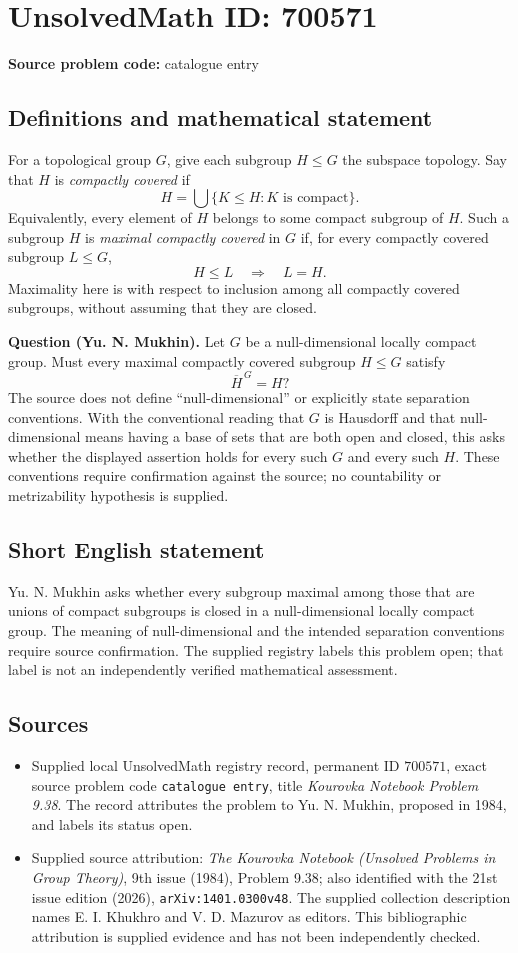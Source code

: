 \documentclass[11pt]{article}
\begin{document}
\section*{UnsolvedMath ID: 700571}
\textbf{Source problem code:} catalogue entry
\subsection{Definitions and mathematical statement}
For a topological group \(G\), give each subgroup \(H\leq G\) the subspace topology. Say that \(H\) is \emph{compactly covered} if
\[
H=\bigcup\{K\leq H:K\text{ is compact}\}.
\]
Equivalently, every element of \(H\) belongs to some compact subgroup of \(H\). Such a subgroup \(H\) is \emph{maximal compactly covered} in \(G\) if, for every compactly covered subgroup \(L\leq G\),
\[
H\leq L\quad\Longrightarrow\quad L=H.
\]
Maximality here is with respect to inclusion among all compactly covered subgroups, without assuming that they are closed.

\textbf{Question (Yu. N. Mukhin).} Let \(G\) be a null-dimensional locally compact group. Must every maximal compactly covered subgroup \(H\leq G\) satisfy
\[
\overline{H}^{\,G}=H?
\]
The source does not define ``null-dimensional'' or explicitly state separation conventions. With the conventional reading that \(G\) is Hausdorff and that null-dimensional means having a base of sets that are both open and closed, this asks whether the displayed assertion holds for every such \(G\) and every such \(H\). These conventions require confirmation against the source; no countability or metrizability hypothesis is supplied.
\subsection{Short English statement}
Yu. N. Mukhin asks whether every subgroup maximal among those that are unions of compact subgroups is closed in a null-dimensional locally compact group. The meaning of null-dimensional and the intended separation conventions require source confirmation. The supplied registry labels this problem open; that label is not an independently verified mathematical assessment.
\subsection{Sources}
\begin{itemize}
\item Supplied local UnsolvedMath registry record, permanent ID \(700571\), exact source problem code \texttt{catalogue entry}, title \emph{Kourovka Notebook Problem 9.38}. The record attributes the problem to Yu. N. Mukhin, proposed in 1984, and labels its status open.
\item Supplied source attribution: \emph{The Kourovka Notebook (Unsolved Problems in Group Theory)}, 9th issue (1984), Problem 9.38; also identified with the 21st issue edition (2026), \texttt{arXiv:1401.0300v48}. The supplied collection description names E. I. Khukhro and V. D. Mazurov as editors. This bibliographic attribution is supplied evidence and has not been independently checked.
\end{itemize}
\end{document}
